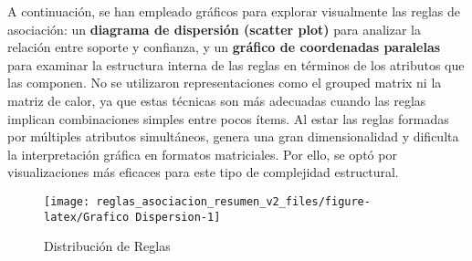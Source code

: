\documentclass[
]{article}
\begin{document}
\begin{table}[!h]
\centering
\caption{\label{tab:Reglas Precio Bajo}Reglas de asociación más relevantes asociadas a Precios Bajos (ordenadas por lift)}
\centering
{}
\end{table}

A continuación, se han empleado gráficos para explorar visualmente las
reglas de asociación: un \textbf{diagrama de dispersión (scatter plot)}
para analizar la relación entre soporte y confianza, y un
\textbf{gráfico de coordenadas paralelas} para examinar la estructura
interna de las reglas en términos de los atributos que las componen. No
se utilizaron representaciones como el grouped matrix ni la matriz de
calor, ya que estas técnicas son más adecuadas cuando las reglas
implican combinaciones simples entre pocos ítems. Al estar las reglas
formadas por múltiples atributos simultáneos, genera una gran
dimensionalidad y dificulta la interpretación gráfica en formatos
matriciales. Por ello, se optó por visualizaciones más eficaces para
este tipo de complejidad estructural.

\begin{figure}[H]

{\centering \texttt{[image: reglas\_asociacion\_resumen\_v2\_files/figure-latex/Grafico Dispersion-1]} 

}

\caption{Distribución de Reglas}\label{fig:Grafico Dispersion}
\end{figure}
\end{document}
